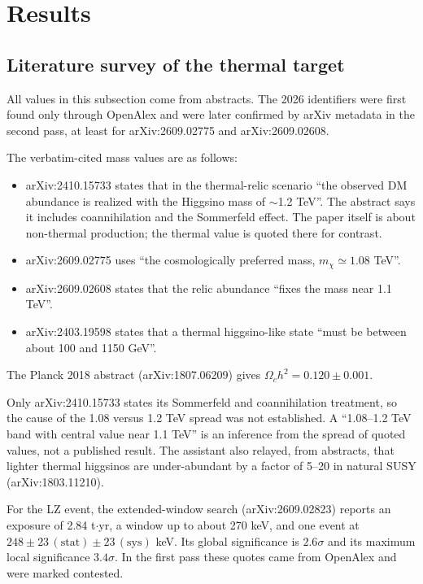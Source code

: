 \documentclass[11pt,a4paper]{article}
\begin{document}
\section{Results}
\subsection{Literature survey of the thermal target}
All values in this subsection come from abstracts. The 2026 identifiers were first found only through OpenAlex and were later confirmed by arXiv metadata in the second pass, at least for arXiv:2609.02775 and arXiv:2609.02608.

The verbatim-cited mass values are as follows:
\begin{itemize}
\item arXiv:2410.15733 states that in the thermal-relic scenario ``the observed DM abundance is realized with the Higgsino mass of $\sim$1.2 TeV''. The abstract says it includes coannihilation and the Sommerfeld effect. The paper itself is about non-thermal production; the thermal value is quoted there for contrast.
\item arXiv:2609.02775 uses ``the cosmologically preferred mass, $m_\chi\simeq1.08$ TeV''.
\item arXiv:2609.02608 states that the relic abundance ``fixes the mass near 1.1 TeV''.
\item arXiv:2403.19598 states that a thermal higgsino-like state ``must be between about 100 and 1150 GeV''.
\end{itemize}
The Planck 2018 abstract (arXiv:1807.06209) gives $\Omega_c h^2 = 0.120\pm0.001$.

Only arXiv:2410.15733 states its Sommerfeld and coannihilation treatment, so the cause of the 1.08 versus 1.2 TeV spread was not established. A ``1.08--1.2 TeV band with central value near 1.1 TeV'' is an inference from the spread of quoted values, not a published result. The assistant also relayed, from abstracts, that lighter thermal higgsinos are under-abundant by a factor of 5--20 in natural SUSY (arXiv:1803.11210).

For the LZ event, the extended-window search (arXiv:2609.02823) reports an exposure of 2.84 t$\cdot$yr, a window up to about 270 keV, and one event at $248\pm23\,(\mathrm{stat})\pm23\,(\mathrm{sys})$ keV. Its global significance is $2.6\sigma$ and its maximum local significance $3.4\sigma$. In the first pass these quotes came from OpenAlex and were marked contested.
\end{document}
